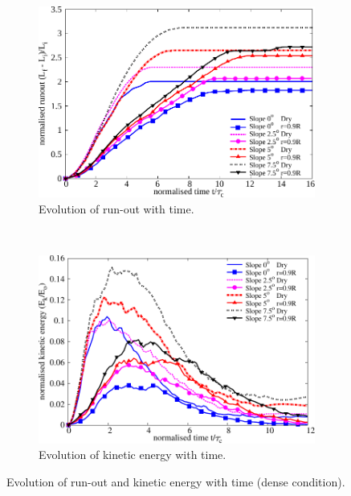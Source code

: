 \begin{figure}
\centering
\begin{subfigure}[t]{0.95\textwidth}
\centering
\includegraphics[width=0.95\columnwidth]{Runout_dense_slope}
\caption{Evolution of run-out with time.}
\label{fig:run_dense}
\end{subfigure}\\
\begin{subfigure}[t]{0.95\textwidth}
\centering
\includegraphics[width=0.95\columnwidth]{KE_dense_slope}
\caption{Evolution of kinetic energy with time.}
\label{fig:KE_dense}
\end{subfigure}
\caption{Evolution of run-out and kinetic energy with time (dense condition).}
\label{fig:run_KE_dense}
\end{figure}

